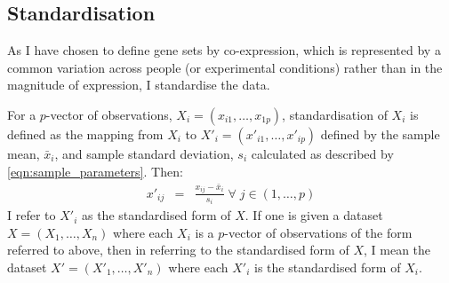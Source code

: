 \documentclass[14pt]{extarticle} %
\begin{document}
	
	
	

	
	\subsection{Standardisation} \label{sec:standardisation}
	As I have chosen to define gene sets by co-expression, which is represented by a common variation across people (or experimental conditions) rather than in the magnitude of expression, I standardise the data.
	
	For a $p$-vector of observations, $X_i=(x_{i1},\ldots,x_{1p})$, standardisation of $X_i$ is defined as the mapping from $X_i$ to $X'_i=(x'_{i1},\ldots,x'_{ip})$ defined by the sample mean, $\bar{x}_i$, and sample standard deviation, $s_i$ calculated as described by \eqref{eqn:sample_parameters}. Then:
	\begin{eqnarray} \label{eqn:standardisation}
	x'_{ij} &=& \frac{x_{ij}- \bar{x}_i}{s_i} \; \forall \; j \in (1,\ldots,p)
	\end{eqnarray}
	I refer to $X'_i$ as the standardised form of $X$. If one is given a dataset $X=(X_1,\ldots,X_n)$ where each $X_i$ is a $p$-vector of observations of the form referred to above, then in referring to the standardised form of $X$, I mean the dataset $X'=(X'_1,\ldots,X'_n)$ where each $X'_i$ is the standardised form of $X_i$.
	
\end{document}
